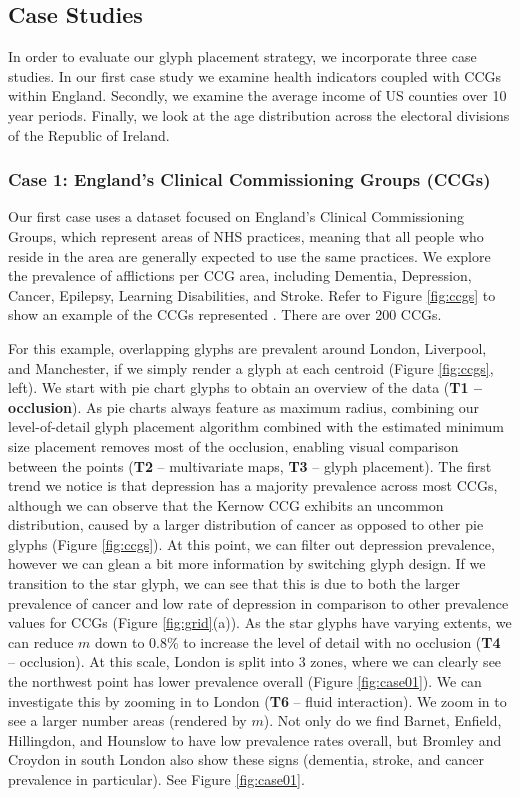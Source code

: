 \subsection{Case Studies}  \label{sec:case}
In order to evaluate our glyph placement strategy, we incorporate three case studies. In our first case study we examine health indicators coupled with CCGs within England. Secondly, we examine the average income of US counties over 10 year periods. Finally, we look at the age distribution across the electoral divisions of the Republic of Ireland.


\subsubsection{Case 1: England's Clinical Commissioning Groups (CCGs)} \label{sec:case01}
Our first case uses a dataset focused on England's Clinical Commissioning Groups, which represent areas of NHS practices, meaning that all people who reside in the area are generally expected to use the same practices. We explore the prevalence of afflictions per CCG area, including Dementia, Depression, Cancer, Epilepsy, Learning Disabilities, and Stroke. Refer to Figure \ref{fig:ccgs} to show an example of the CCGs represented \cite{publicHealthEngland}. There are over 200 CCGs.

For this example, overlapping glyphs are prevalent around London, Liverpool, and Manchester, if we simply render a glyph at each centroid (Figure \ref{fig:ccgs}, left). We start with pie chart glyphs to obtain an overview of the data (\textbf{T1 -- occlusion}). As pie charts always feature as maximum radius, combining our level-of-detail glyph placement algorithm combined with the estimated minimum size placement removes most of the occlusion, enabling visual comparison between the points (\textbf{T2} -- multivariate maps, \textbf{T3} -- glyph placement). The first trend we notice is that depression has a majority prevalence across most CCGs, although we can observe that the Kernow CCG  exhibits an uncommon distribution, caused by a larger distribution of cancer as opposed to other pie glyphs (Figure \ref{fig:ccgs}). At this point, we can filter out depression prevalence, however we can glean a bit more information by switching glyph design. If we transition to the star glyph, we can see that this is due to both the larger prevalence of cancer and low rate of depression in comparison to other prevalence values for CCGs (Figure \ref{fig:grid}(a)).
As the star glyphs have varying extents, we can reduce $m$ down to 0.8\% to increase the level of detail with no occlusion (\textbf{T4} -- occlusion). At this scale, London is split into 3 zones, where we can clearly see the northwest point has lower prevalence overall (Figure \ref{fig:case01}). We can investigate this by zooming in to London (\textbf{T6} -- fluid interaction). We zoom in to see a larger number areas (rendered by $m$). Not only do we find Barnet, Enfield, Hillingdon, and Hounslow to have low prevalence rates overall, but Bromley and Croydon in south London also show these signs (dementia, stroke, and cancer prevalence in particular). See Figure \ref{fig:case01}.

